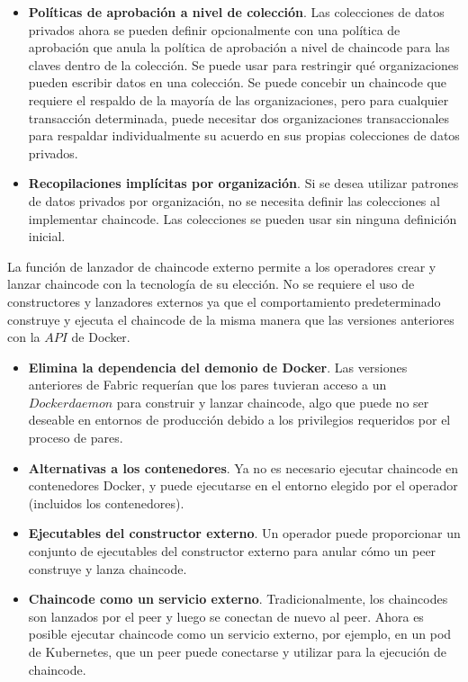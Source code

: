 {\begin{itemize}
\item {\bf Pol\'iticas de aprobaci\'on a nivel de colecci\'on}. Las colecciones de datos privados ahora se pueden definir opcionalmente con una pol\'itica de aprobaci\'on que anula la pol\'itica de aprobaci\'on a nivel de chaincode para las claves dentro de la colecci\'on. Se puede usar para restringir qu\'e organizaciones pueden escribir datos en una colecci\'on. Se puede concebir un chaincode que requiere el respaldo de la mayor\'ia de las organizaciones, pero para cualquier transacci\'on determinada, puede necesitar dos organizaciones transaccionales para respaldar individualmente su acuerdo en sus propias colecciones de datos privados.

\item {\bf Recopilaciones impl\'icitas por organizaci\'on}. Si se desea utilizar patrones de datos privados por organizaci\'on, no se necesita definir las colecciones al implementar chaincode. Las colecciones se pueden usar sin ninguna definici\'on inicial.
\end{itemize}

La funci\'on de lanzador de chaincode externo permite a los operadores crear y lanzar chaincode con la tecnolog\'ia de su elecci\'on. No se requiere el uso de constructores y lanzadores externos ya que el comportamiento predeterminado construye y ejecuta el chaincode de la misma manera que las versiones anteriores con la $API$ de Docker.

\begin{itemize}

\item {\bf Elimina la dependencia del demonio de Docker}. Las versiones anteriores de Fabric requer\'ian que los pares tuvieran acceso a un $Docker
daemon$  para construir y lanzar chaincode, algo que puede no ser deseable en entornos de producci\'on debido a los privilegios requeridos por el proceso de pares.

\item {\bf Alternativas a los contenedores}. Ya no es necesario ejecutar chaincode en contenedores Docker, y puede ejecutarse en el entorno elegido por el operador (incluidos los contenedores).

\item {\bf Ejecutables del constructor externo}. Un operador puede proporcionar un conjunto de ejecutables del constructor externo para anular c\'omo un
peer construye y lanza chaincode.

\item {\bf Chaincode como un servicio externo}. Tradicionalmente, los chaincodes son lanzados por el peer y luego se conectan de nuevo al peer. Ahora es posible ejecutar chaincode como un servicio externo, por ejemplo, en un pod de Kubernetes, que un peer puede conectarse y utilizar para la ejecuci\'on de chaincode.
\end{itemize}

}
